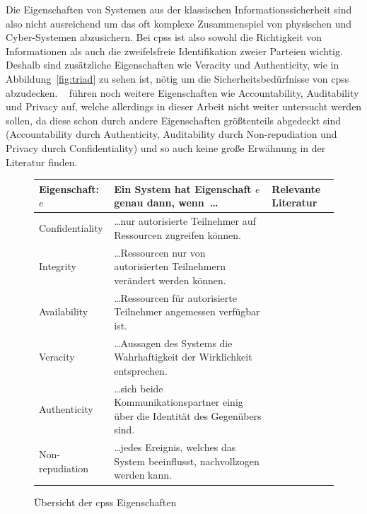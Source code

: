 \documentclass[final,bibliography=totocnumbered]{include/sikseminar}
\newcommand{\cps}{\glspl{cps}\xspace}
\begin{document}
    Die Eigenschaften von Systemen aus der klassischen Informationssicherheit sind also nicht ausreichend um das oft komplexe Zusammenspiel von physischen und Cyber-Systemen abzusichern.
    Bei \cps ist also sowohl die Richtigkeit von Informationen als auch die zweifelsfreie Identifikation zweier Parteien wichtig.
    Deshalb sind zusätzliche Eigenschaften wie Veracity und Authenticity, wie in Abbildung~\ref{fig:triad} zu sehen ist, nötig um die Sicherheitsbedürfnisse von \cps abzudecken.
    \citeauthor{CH13}~\cite{CH13} führen noch weitere Eigenschaften wie Accountability, Auditability und Privacy auf, welche allerdings in dieser Arbeit nicht weiter untersucht werden sollen, da diese schon durch andere Eigenschaften größtenteils abgedeckt sind (Accountability durch Authenticity, Auditability durch Non-repudiation und Privacy durch Confidentiality) und so auch keine große Erwähnung in der Literatur finden.

    \begin{figure}[ht]
        \centering
        \begin{tabu}
            to \linewidth { | l | X[6,l] | X[1.1,l] | }
            \hline
            Eigenschaft: $e$&Ein System hat Eigenschaft $e$ genau dann, wenn~\ldots&Relevante Literatur \\
            \hline
            Confidentiality&
            \ldots nur autorisierte Teilnehmer auf Ressourcen zugreifen können.&
            \cite{CH13} \\
            \hline
            Integrity&
            \ldots Ressourcen nur von autorisierten Teilnehmern verändert werden können.&
            \cite{CH13} \\
            \hline
            Availability&
            \ldots Ressourcen für autorisierte Teilnehmer angemessen verfügbar ist.&
            \cite{CH13} \\
            \hline
            Veracity &
            \ldots Aussagen des Systems die Wahrhaftigkeit der Wirklichkeit entsprechen.&
            \cite{KLG15} \cite{GK16}\\
            \hline
            Authenticity&
            \ldots sich beide Kommunikationspartner einig über die Identität des Gegenübers sind.&
            \cite{SFJ17} \cite{CH13}\\
            \hline
            Non-repudiation &
            \ldots jedes Ereignis, welches das System beeinflusst, nachvollzogen werden kann.&
            \cite{CH13} \cite{SFJ17} \cite{Ross15} \\
            \hline
        \end{tabu}
        \caption{Übersicht der \cps Eigenschaften}
        \label{fig:table}
    \end{figure}
\end{document}
